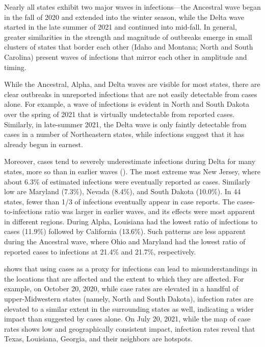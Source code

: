 Nearly all states exhibit two major waves in infections---the Ancestral wave
began in the fall of 2020 and extended into the winter season, while the Delta
wave started in the late summer of 2021 and continued into mid-fall. In general,
greater similarities in the strength and magnitude of outbreaks emerge in small
clusters of states that border each other (Idaho and Montana; North and South
Carolina) present waves of infections that mirror each other in amplitude and
timing.

While the Ancestral, Alpha, and Delta waves are visible for most states, there
are clear outbreaks in unreported infections that are not easily detectable from
cases alone. For example, a wave of infections is evident in North and South
Dakota over the spring of 2021 that is virtually undetectable from reported
cases. Similarly, in late-summer 2021, the Delta wave is only faintly
detectable from cases in a number of Northeastern states, while infections
suggest that it has already begun in earnest.  

Moreover, cases tend to severely underestimate infections during Delta for many
states, more so than in earlier waves (). The most
extreme was New Jersey, where about 6.3\% of estimated infections were
eventually reported as cases. Similarly low are Maryland (7.3\%), Nevada
(8.4\%), and South Dakota (10.0\%). In 44 states, fewer than 1/3 of infections
eventually appear in case reports. The cases-to-infections ratio was larger in
earlier waves, and its effects were most apparent in different regions. During
Alpha, Louisiana had the lowest ratio of infections to cases (11.9\%) followed
by California (13.6\%). Such patterns are less apparent during the Ancestral
wave, where Ohio and Maryland had the lowest ratio of reported cases to
infections at 21.4\% and 21.7\%, respectively. 

 shows that using cases as a proxy for infections
can lead to misunderstandings in the locations that are affected and the extent
to which they are affected. For example, on October 20, 2020, while case rates
are elevated in a handful of upper-Midwestern states (namely, North and South
Dakota), infection rates are elevated to a similar extent in the surrounding
states as well, indicating a wider impact than suggested by cases alone. On July
20, 2021, while the map of case rates shows low and geographically consistent
impact, infection rates reveal that Texas, Louisiana, Georgia, and their
neighbors are hotspots. 
 
